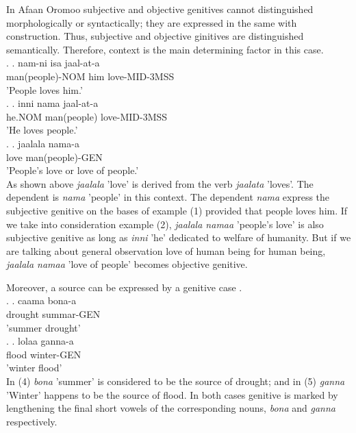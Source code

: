 \documentclass[11pt,a4paper]{article}
\begin{document}
	
	In Afaan Oromoo subjective and objective genitives cannot distinguished morphologically or syntactically; they are expressed in the same with construction. Thus, subjective and objective ginitives are distinguished semantically. Therefore, context is the main determining factor in this case. \\
	
	\ex. 
	\ag.
	nam-ni isa jaal-at-a\\
	man(people)-NOM him love-MID-3MSS\\
	'People loves him.'\\
	
	\ex. 
	\ag.
	inni nama jaal-at-a\\
	he.NOM man(people) love-MID-3MSS\\
	'He loves people.'\\
	
	\ex. 
	\ag.
	jaalala nama-a\\
	love man(people)-GEN\\
	'People's love or love of people.'\\
	
	As shown above \emph{jaalala} 'love' is derived from the verb \emph{jaalata} 'loves'. The dependent is \emph{nama} 'people' in this context. The dependent \emph{nama} express the subjective genitive on the bases of example (1) provided that people loves him. If we take into consideration example (2), \emph{jaalala namaa} 'people's love' is also subjective genitive as long as \emph{inni} 'he' dedicated to welfare of humanity. But if we are talking about general observation love of human being for human being, \emph{jaalala namaa} 'love of people' becomes objective genitive. 
	
	
	Moreover, a source can be expressed by a genitive case \cite[69]{greenlee1950genitive}. \\
	
	\ex.
	\ag.
	caama bona-a\\
	drought summar-GEN\\
	'summer drought'\\
	
	\ex.
	\ag.
	lolaa ganna-a\\
	flood winter-GEN\\
	'winter flood'\\
	
	In (4) \emph{bona} 'summer' is considered to be the source of drought; and in (5) \emph{ganna} 'Winter' happens to be the source of flood. In both cases genitive is marked by lengthening the final short vowels of the corresponding nouns, \emph{bona} and \emph{ganna} respectively. 
	
\end{document}
